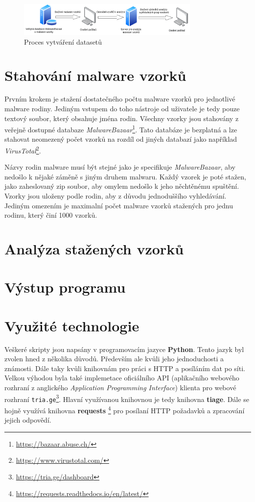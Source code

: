 \begin{figure}[h]
	\centering
        \includegraphics[width=0.8\textwidth]{obrazky/pipeline.png}
	\caption{Proces vytváření datasetů}
    \label{pipeline}
\end{figure}

\section{Stahování malware vzorků}
Prvním krokem je stažení dostatečného počtu malware vzorků pro jednotlivé malware rodiny. Jediným vstupem do toho nástroje od uživatele je tedy pouze textový soubor, který obsahuje
jména rodin. Všechny vzorky jsou stahovány z veřejně dostupné databaze \textit{MalwareBazaar}\footnote{\href{https://bazaar.abuse.ch/}{https://bazaar.abuse.ch/}}. Tato databáze je 
bezplatná a lze stahovat neomezený počet vzorků na rozdíl od jiných databazí jako například \textit{VirusTotal}\footnote{\href{https://www.virustotal.com/gui/home/upload}{https://www.virustotal.com/}}.

Názvy rodin malware musí být stejné jako je specifikuje \textit{MalwareBazaar}, aby nedošlo k nějaké záměně s jiným druhem malwaru. Každý vzorek je poté stažen, jako zaheslovaný zip soubor, aby omylem nedošlo k 
jeho něchtěnému spuštění. Vzorky jsou uloženy podle rodin, aby z důvodu jednoduššího vyhledávání. Jediným omezením je maximalní počet malware vzorků stažených pro jednu rodinu, který činí 1000 vzorků.

\section{Analýza stažených vzorků}
\section{Výstup programu}

\section{Využité technologie}

Veškeré skripty jsou napsány v programovacím jazyce \textbf{Python}. Tento jazyk byl zvolen hned z několika důvodů.
Především ale kvůli jeho jednoduchosti a známosti. Dále taky kvůli knihovnám pro práci s HTTP a posíláním dat po síti.
Velkou výhodou byla také implemetace oficiálního API (aplikačního webového rozhraní z anglického \textit{Application Programming Interface}) klienta pro webové rozhraní 
\texttt{tria.ge}\footnote{\href{https://tria.ge/dashboard}{https://tria.ge/dashboard}}. 
Hlavní využívanou knihovnou je tedy knihovna \textbf{tiage}. Dále se hojně využívá knihovna \textbf{requests} \footnote{\href{https://requests.readthedocs.io/en/latest/}{https://requests.readthedocs.io/en/latest/}}
pro posílaní HTTP požadavků a zpracování jejich odpovědí.

